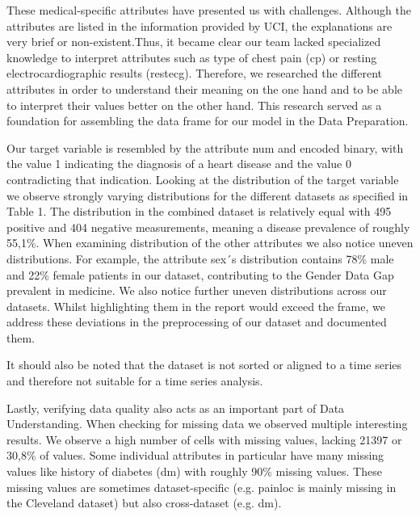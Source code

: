 
These medical-specific attributes have presented us with challenges. Although the attributes are listed in the information provided by UCI, the explanations are very brief or non-existent.Thus, it became clear our team lacked specialized knowledge to interpret attributes such as type of chest pain (cp) or resting electrocardiographic results (restecg). Therefore, we researched the different attributes in order to understand their meaning on the one hand and to be able to interpret their values better on the other hand. This research served as a foundation for assembling the data frame for our model in the Data Preparation. 

Our target variable is resembled by the attribute num and encoded binary, with the value 1 indicating the diagnosis of a heart disease and the value 0 contradicting that indication. Looking at the distribution of the target variable we observe strongly varying distributions for the different datasets as specified in Table 1. The distribution in the combined dataset is relatively equal with 495 positive and 404 negative measurements, meaning a disease prevalence of roughly 55,1\%. When examining distribution of the other attributes we also notice uneven distributions. For example, the attribute sex´s distribution contains 78\% male and 22\% female patients in our dataset, contributing to the Gender Data Gap prevalent in medicine. We also notice further uneven distributions across our datasets. Whilst highlighting them in the report would exceed the frame, we address these deviations in the preprocessing of our dataset and documented them.  

It should also be noted that the dataset is not sorted or aligned to a time series and therefore not suitable for a time series analysis. 

Lastly, verifying data quality also acts as an important part of Data Understanding. When checking for missing data we observed multiple interesting results. We observe a high number of cells with missing values, lacking 21397 or 30,8\% of values. Some individual attributes in particular have many missing values like history of diabetes (dm) with roughly 90\% missing values. These missing values are sometimes dataset-specific (e.g. painloc is mainly missing in the Cleveland dataset) but also cross-dataset (e.g. dm). 

